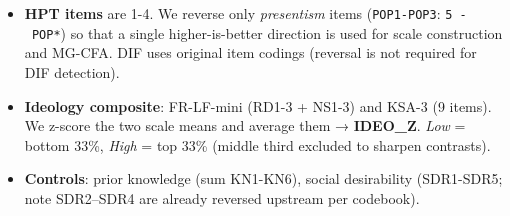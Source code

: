 \documentclass[
  10pt,
]{article}
\providecommand{\tightlist}{%
  \setlength{\itemsep}{0pt}\setlength{\parskip}{0pt}}
\begin{document}
\begin{itemize}
\tightlist
\item
  \textbf{HPT items} are 1-4. We reverse only \emph{presentism} items
  (\texttt{POP1-POP3}: \texttt{5\ -\ POP*}) so that a single
  higher-is-better direction is used for scale construction and MG-CFA.
  DIF uses original item codings (reversal is not required for DIF
  detection).
\item
  \textbf{Ideology composite}: FR-LF-mini (RD1-3 + NS1-3) and KSA-3 (9
  items). We z-score the two scale means and average them →
  \textbf{IDEO\_Z}. \emph{Low} = bottom 33\%, \emph{High} = top 33\%
  (middle third excluded to sharpen contrasts).
\item
  \textbf{Controls}: prior knowledge (sum KN1-KN6), social desirability
  (SDR1-SDR5; note SDR2--SDR4 are already reversed upstream per
  codebook).
\end{itemize}
\end{document}
